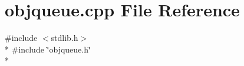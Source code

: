 \section{objqueue.\+cpp File Reference}
\label{objqueue_8cpp}
{\ttfamily \#include $<$stdlib.\+h$>$}\\*
{\ttfamily \#include \char`\"{}objqueue.\+h\char`\"{}}\\*
